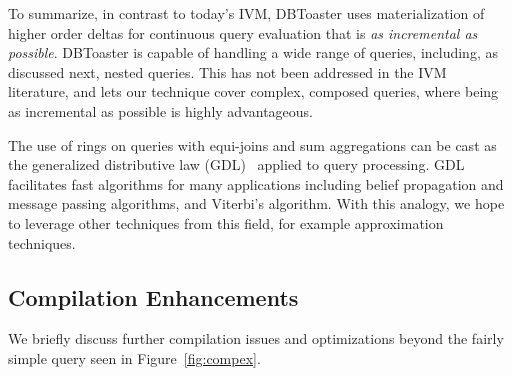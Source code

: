 To summarize, in contrast to today's IVM, DBToaster uses materialization of
higher order deltas for continuous query evaluation that is \textit{as
incremental as possible}. DBToaster is capable of handling a wide range of
queries, including, as discussed next, nested queries. This has not been
addressed in the IVM literature, and lets our technique cover complex, composed
queries, where being as incremental as possible is highly advantageous.

The use of rings on queries with equi-joins and sum aggregations can be cast as
the generalized distributive law (GDL)~\cite{aji-toit:00} applied to query
processing. GDL facilitates fast algorithms for many applications including
belief propagation and message passing algorithms, and Viterbi's algorithm. With
this analogy, we hope to leverage other techniques from this field, for example
approximation techniques.


\subsection{Compilation Enhancements}
\noindent We briefly discuss further compilation issues and optimizations beyond
the fairly simple query seen in Figure~\ref{fig:compex}.


